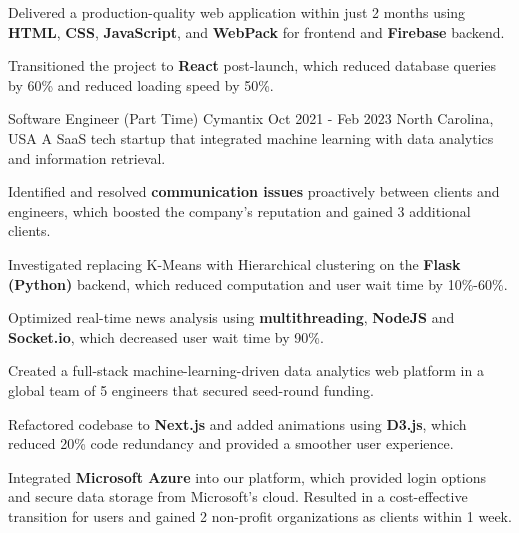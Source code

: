 \begin{cventries}
{\begin{cvitems}
        \item {Delivered a production-quality web application within just 2 months using \textbf{HTML}, \textbf{CSS}, \textbf{JavaScript}, and \textbf{WebPack} for frontend and \textbf{Firebase} backend.}
        \item {Transitioned the project to \textbf{React} post-launch, which reduced database queries by 60\% and reduced loading speed by 50\%.}
      \end{cvitems}
    }

    \cventry
    {Software Engineer (Part Time)} %
    {Cymantix} %
    {Oct 2021 - Feb 2023} %
    {North Carolina, USA} %
    {A SaaS tech startup that integrated machine learning with data analytics and information retrieval.}
    {
      \begin{cvitems} %
        \item {Identified and resolved \textbf{communication issues} proactively between clients and engineers, which boosted the company's reputation and gained 3 additional clients.}
        \item {Investigated replacing K-Means with Hierarchical clustering on the \textbf{Flask (Python)} backend, which reduced computation and user wait time by 10\%-60\%.}
        \item {Optimized real-time news analysis using \textbf{multithreading}, \textbf{NodeJS} and \textbf{Socket.io}, which decreased user wait time by 90\%.}
        \item {Created a full-stack machine-learning-driven data analytics web platform in a global team of 5 engineers that secured seed-round funding.}
        \item {Refactored codebase to \textbf{Next.js} and added animations using \textbf{D3.js}, which reduced 20\% code redundancy and provided a smoother user experience.}
        \item {Integrated \textbf{Microsoft Azure} into our platform, which provided login options and secure data storage from Microsoft's cloud. Resulted in a cost-effective transition for users and gained 2 non-profit organizations as clients within 1 week.}
      \end{cvitems}
    }


\end{cventries}
